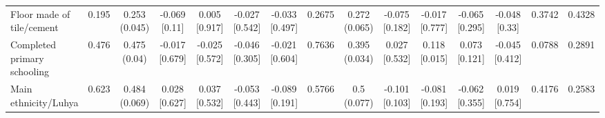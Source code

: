 \documentclass[
]{article}
\begin{document}
\begin{table}[htbp]
{\begin{tabular}[t]{lcccccccccccccc}
\addlinespace[0.3em]
\hline
\multicolumn{15}{l}{\textit{\textbf{Panel B: Baseline demographics, $N=1,995$}}}\\
\hline
\hspace{1em}Floor made of tile/cement & 0.195 & \makecell[c]{0.253\\(0.045)} & \makecell[c]{-0.069\\{[0.11]}} & \makecell[c]{0.005\\{[0.917]}} & \makecell[c]{-0.027\\{[0.542]}} & \makecell[c]{-0.033\\{[0.497]}} & 0.2675 & \makecell[c]{0.272\\(0.065)} & \makecell[c]{-0.075\\{[0.182]}} & \makecell[c]{-0.017\\{[0.777]}} & \makecell[c]{-0.065\\{[0.295]}} & \makecell[c]{-0.048\\{[0.33]}} & 0.3742 & 0.4328\\
\hspace{1em}Completed primary schooling & 0.476 & \makecell[c]{0.475\\(0.04)} & \makecell[c]{-0.017\\{[0.679]}} & \makecell[c]{-0.025\\{[0.572]}} & \makecell[c]{-0.046\\{[0.305]}} & \makecell[c]{-0.021\\{[0.604]}} & 0.7636 & \makecell[c]{0.395\\(0.034)} & \makecell[c]{0.027\\{[0.532]}} & \makecell[c]{0.118\\{[0.015]}} & \makecell[c]{0.073\\{[0.121]}} & \makecell[c]{-0.045\\{[0.412]}} & 0.0788 & 0.2891\\
\hspace{1em}Main ethnicity/Luhya & 0.623 & \makecell[c]{0.484\\(0.069)} & \makecell[c]{0.028\\{[0.627]}} & \makecell[c]{0.037\\{[0.532]}} & \makecell[c]{-0.053\\{[0.443]}} & \makecell[c]{-0.089\\{[0.191]}} & 0.5766 & \makecell[c]{0.5\\(0.077)} & \makecell[c]{-0.101\\{[0.103]}} & \makecell[c]{-0.081\\{[0.193]}} & \makecell[c]{-0.062\\{[0.355]}} & \makecell[c]{0.019\\{[0.754]}} & 0.4176 & 0.2583\\

\end{tabular}}
\end{table}
\end{document}

